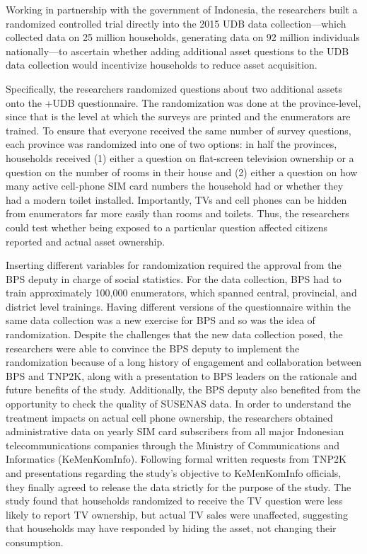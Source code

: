 \documentclass[
]{WileySix}
\begin{document}
Working in partnership with the government of Indonesia, the researchers built a randomized controlled trial directly into the 2015 UDB data collection---which collected data on 25 million households, generating data on 92 million individuals nationally---to ascertain whether adding additional asset questions to the UDB data collection would incentivize households to reduce asset acquisition.

Specifically, the researchers randomized questions about two additional assets onto the +UDB\textbar{} questionnaire. The randomization was done at the province-level, since that is the level at which the surveys are printed and the enumerators are trained. To ensure that everyone received the same number of survey questions, each province was randomized into one of two options: in half the provinces, households received (1) either a question on flat-screen television ownership or a question on the number of rooms in their house and (2) either a question on how many active cell-phone SIM card numbers the household had or whether they had a modern toilet installed. Importantly, TVs and cell phones can be hidden from enumerators far more easily than rooms and toilets. Thus, the researchers could test whether being exposed to a particular question affected citizens reported and actual asset ownership.

Inserting different variables for randomization required the approval from the BPS deputy in charge of social statistics. For the data collection, BPS had to train approximately 100,000 enumerators, which spanned central, provincial, and district level trainings. Having different versions of the questionnaire within the same data collection was a new exercise for BPS and so was the idea of randomization. Despite the challenges that the new data collection posed, the researchers were able to convince the BPS deputy to implement the randomization because of a long history of engagement and collaboration between BPS and TNP2K, along with a presentation to BPS leaders on the rationale and future benefits of the study. Additionally, the BPS deputy also benefited from the opportunity to check the quality of SUSENAS data. In order to understand the treatment impacts on actual cell phone ownership, the researchers obtained administrative data on yearly SIM card subscribers from all major Indonesian telecommunications companies through the Ministry of Communications and Informatics (KeMenKomInfo). Following formal written requests from TNP2K and presentations regarding the study's objective to KeMenKomInfo officials, they finally agreed to release the data strictly for the purpose of the study. The study found that households randomized to receive the TV question were less likely to report TV ownership, but actual TV sales were unaffected, suggesting that households may have responded by hiding the asset, not changing their consumption.
\end{document}

